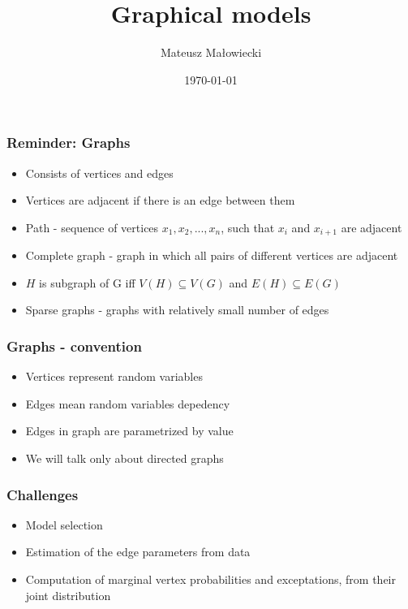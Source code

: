 \documentclass{beamer}
\title{Graphical models}
\author{Mateusz Małowiecki}
\institute[Instytut Informatyki Uniwersytetu Wrocławskiego]{}
\date{\today}
\begin{document}
\begin{frame}
  \titlepage
\end{frame}
\begin{frame}
  \frametitle{Reminder: Graphs}
    \begin{itemize}
      \item Consists of vertices and edges
      \item Vertices are adjacent if there is an edge between them
      \item Path - sequence of vertices $x_1, x_2, ..., x_n$, such that $x_i$ and $x_{i+1}$ are adjacent 
      \item Complete graph - graph in which all pairs of different vertices are adjacent 
      \item $H$ is subgraph of G iff $V(H) \subseteq V(G)$ and $E(H) \subseteq E(G)$  
      \item Sparse graphs - graphs with relatively small number of edges
    \end{itemize}
\end{frame}
\begin{frame}
  \frametitle{Graphs - convention}
  \begin{itemize}
      \item Vertices represent random variables
      \item Edges mean random variables depedency
	  \item Edges in graph are parametrized by value      
      \item We will talk only about directed graphs
  \end{itemize}
\end{frame}
\begin{frame}
\frametitle{Challenges}
  \begin{itemize}
      \item Model selection
      \item Estimation of the edge parameters from data
      \item Computation of marginal vertex probabilities and exceptations, from their joint distribution
  \end{itemize}
\end{frame}
\end{document}
